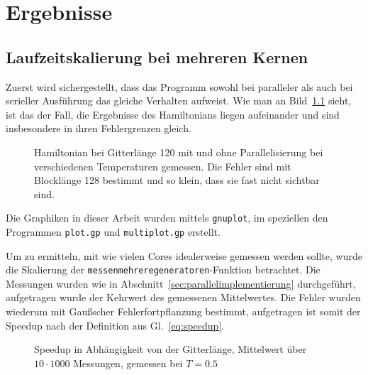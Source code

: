 	\chapter{Ergebnisse}
	\label{chap:ergebnisse}
	
	
	\section{Laufzeitskalierung bei mehreren Kernen}
	\label{sec:ergebnisparallel}
	Zuerst wird sichergestellt, dass das Programm sowohl bei paralleler als auch bei serieller Ausführung das gleiche Verhalten aufweist. Wie man an Bild~\ref{fig:vergleichham} sieht, ist das der Fall, die Ergebnisse des Hamiltonians liegen aufeinander und sind insbesondere in ihren Fehlergrenzen gleich.
	
	\begin{figure}[htbp]
		
		\caption[Hamiltonian mit und ohne Parallelisierung]{Hamiltonian bei Gitterlänge 120 mit und ohne Parallelisierung bei verschiedenen Temperaturen gemessen. Die Fehler sind mit Blocklänge 128 bestimmt und so klein, dass sie fast nicht sichtbar sind.}
		\label{fig:vergleichham}
	\end{figure}
	
	Die Graphiken in dieser Arbeit wurden mittels \texttt{gnuplot}\cite{gnuplotdoc}, im speziellen den Programmen \texttt{plot.gp} und \texttt{multiplot.gp} erstellt.
	
	Um zu ermitteln, mit wie vielen Cores idealerweise gemessen werden sollte, wurde die Skalierung der \texttt{messenmehreregeneratoren}-Funktion betrachtet. Die Messungen wurden wie in Abschnitt~\ref{sec:parallelimplementierung} durchgeführt, aufgetragen wurde der Kehrwert des gemessenen Mittelwertes. Die Fehler wurden wiederum mit Gaußscher Fehlerfortpflanzung bestimmt, aufgetragen ist somit der Speedup nach der Definition aus Gl.~\ref{eq:speedup}.%
	
	\begin{figure}[htbp]
		
		\caption[Speedup in Abhängigkeit von der Gitterlänge]{Speedup in Abhängigkeit von der Gitterlänge, Mittelwert über $10 \cdot 1000$ Messungen, gemessen bei $T=\num{0,5}$}
		\label{fig:skalierunglaenge}
	\end{figure}
	
